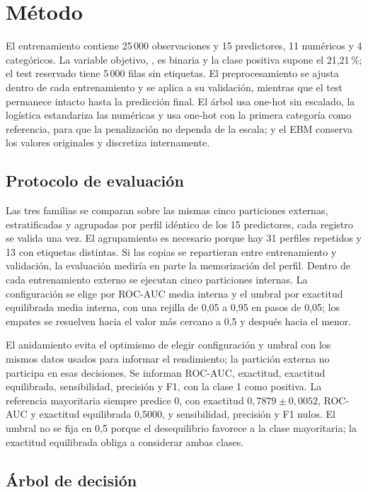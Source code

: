 \section{Método}\label{sec:method}

El entrenamiento contiene 25\,000 observaciones y 15 predictores, 11 numéricos y 4 categóricos. La variable objetivo, , es binaria y la clase positiva supone el 21,21\,\%; el test reservado tiene 5\,000 filas sin etiquetas. El preprocesamiento se ajusta dentro de cada entrenamiento y se aplica a su validación, mientras que el test permanece intacto hasta la predicción final. El árbol usa one-hot sin escalado, la logística estandariza las numéricas y usa one-hot con la primera categoría como referencia, para que la penalización no dependa de la escala; y el EBM conserva los valores originales y discretiza internamente.

\subsection{Protocolo de evaluación}

Las tres familias se comparan sobre las mismas cinco particiones externas, estratificadas y agrupadas por perfil idéntico de los 15 predictores, cada registro se valida una vez. El agrupamiento es necesario porque hay 31 perfiles repetidos y 13 con etiquetas distintas. Si las copias se repartieran entre entrenamiento y validación, la evaluación mediría en parte la memorización del perfil. Dentro de cada entrenamiento externo se ejecutan cinco particiones internas. La configuración se elige por ROC-AUC media interna y el umbral por exactitud equilibrada media interna, con una rejilla de 0,05 a 0,95 en pasos de 0,05; los empates se resuelven hacia el valor más cercano a 0,5 y después hacia el menor.

El anidamiento evita el optimismo de elegir configuración y umbral con los mismos datos usados para informar el rendimiento; la partición externa no participa en esas decisiones. Se informan ROC-AUC, exactitud, exactitud equilibrada, sensibilidad, precisión y F1, con la clase 1 como positiva. La referencia mayoritaria siempre predice 0, con exactitud $0{,}7879 \pm 0{,}0052$, ROC-AUC y exactitud equilibrada 0,5000, y sensibilidad, precisión y F1 nulos. El umbral no se fija en 0,5 porque el desequilibrio favorece a la clase mayoritaria; la exactitud equilibrada obliga a considerar ambas clases.

\subsection{Árbol de decisión}

